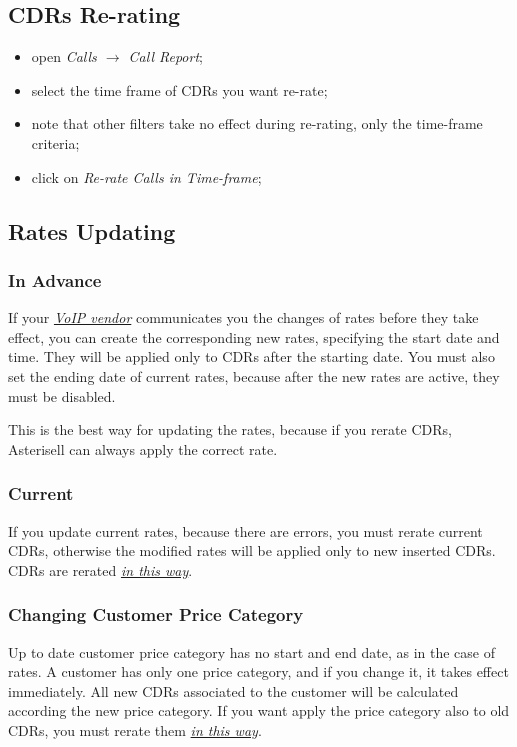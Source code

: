 \documentclass[letterpaper,10pt,english]{sphinxmanual}
\begin{document}
\subsection{CDRs Re-rating}
\label{index:cdr-rerating}\label{index:cdrs-re-rating}\begin{itemize}
\item {} 
open \emph{Calls \(\rightarrow\) Call Report};

\item {} 
select the time frame of CDRs you want re-rate;

\item {} 
note that other filters take no effect during re-rating, only the time-frame criteria;

\item {} 
click on \emph{Re-rate Calls in Time-frame};

\end{itemize}


\subsection{Rates Updating}
\label{index:rates-updating}

\subsubsection{In Advance}
\label{index:in-advance}
If your {\hyperref[index:term-voip-vendor]{\emph{VoIP vendor}}} communicates you the changes of rates before they take effect, you can create the corresponding new rates, specifying the start date and time. They will be applied only to CDRs after the starting date. You must also set the ending date of current rates, because after the new rates are active, they must be disabled.

This is the best way for updating the rates, because if you rerate CDRs, Asterisell can always apply the correct rate.


\subsubsection{Current}
\label{index:current}
If you update current rates, because there are errors, you must rerate current CDRs, otherwise the modified rates will be applied only to new inserted CDRs. CDRs are rerated {\hyperref[index:cdr-rerating]{\emph{in this way}}}.


\subsubsection{Changing Customer Price Category}
\label{index:changing-customer-price-category}
Up to date customer price category has no start and end date, as in the case of rates. A customer has only one price category, and if you change it, it takes effect immediately. All new CDRs associated to the customer will be calculated according the new price category. If you want apply the price category also to old CDRs, you must rerate them {\hyperref[index:cdr-rerating]{\emph{in this way}}}.
\end{document}
